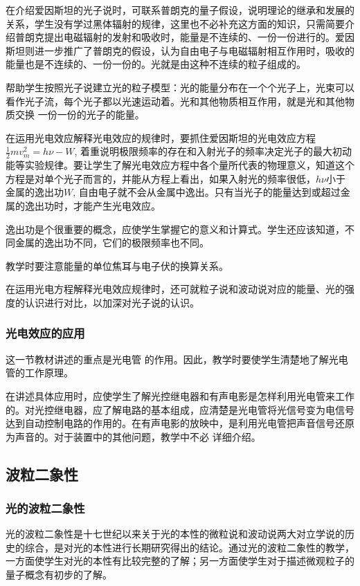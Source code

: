 在介绍爱因斯坦的光子说时，可联系普朗克的量子假设，说明理论的继承和发展的关系，学生没有学过黑体辐射的规律，这里也不必补充这方面的知识，只需简要介绍普朗克提出电磁辐射的发射和吸收时，能量是不连续的、一份一份进行的。爱因斯坦则进一步推广了普朗克的假设，认为自由电子与电磁辐射相互作用时，吸收的能量也是不连续的、一份一份的。光就是由这种不连续的粒子组成的。

帮助学生按照光子说建立光的粒子模型：光的能量分布在一个个光子上，光束可以看作光子流，每个光子都以光速运动着。光和其他物质相互作用，就是光和其他物质交换
一份一份的光子的能量。

在运用光电效应解释光电效应的规律时，要抓住爱因斯坦的光电效应方程$\frac{1}{2}mv^2_m=h\nu-W$, 着重说明极限频率的存在和入射光子的频率决定光子的最大初动能等实验规律。要让学生了解光电效应方程中各个量所代表的物理意义，知道这个方程是对单个光子而言的，并能从方程上看出，如果入射光的频率很低，$h\nu$小于金属的逸出功$W$, 自由电子就不会从金属中逸出。只有当光子的能量达到或超过金属的逸出功时，才能产生光电效应。

逸出功是个很重要的概念，应使学生掌握它的意义和计算式。学生还应该知道，不同金属的逸出功不同，它们的极限频率也不同。

教学时要注意能量的单位焦耳与电子伏的换算关系。

在运用光电方程解释光电效应规律时，还可就粒子说和波动说对应的能量、光的强度的认识进行对比，以加深对光子说的认识。

\subsubsection{光电效应的应用} 

这一节教材讲述的重点是光电管
的作用。因此，教学时要使学生清楚地了解光电管的工作原理。

在讲述具体应用时，应使学生了解光控继电器和有声电影是怎样利用光电管来工作的。对光控继电器，应了解电路的基本组成，应清楚是光电管将光信号变为电信号达到自动控制电路的作用的。在有声电影的放映中，是利用光电管把声音信号还原为声音的。对于装置中的其他问题，教学中不必
详细介绍。

\subsection{波粒二象性}
\subsubsection{光的波粒二象性}

光的波粒二象性是十七世纪以来关于光的本性的微粒说和波动说两大对立学说的历史的综合，是对光的本性进行长期研究得出的结论。通过光的波粒二象性的教学，一方面使学生对光的本性有比较完整的了解；另一方面使学生对于描述微观粒子的量子概念有初步的了解。

